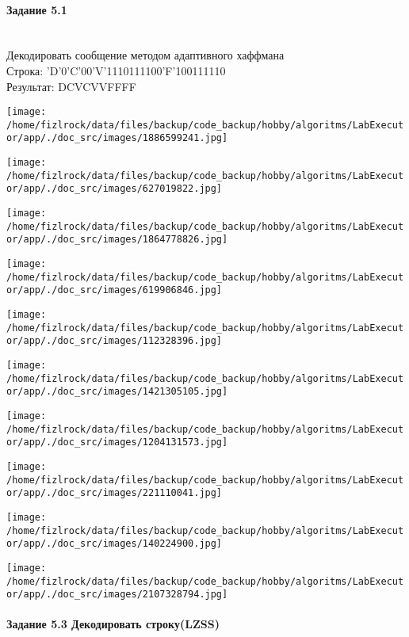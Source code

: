 \documentclass[a4paper, 12pt]{article}
\begin{document}
\paragraph{Задание 5.1}

\\ 

Декодировать сообщение методом адаптивного хаффмана \\
Строка: 
'D'0'C'00'V'1110111100'F'100111110\\
Результат: DCVCVVFFFF

\texttt{[image: /home/fizlrock/data/files/backup/code\_backup/hobby/algoritms/LabExecutor/app/./doc\_src/images/1886599241.jpg]}

\texttt{[image: /home/fizlrock/data/files/backup/code\_backup/hobby/algoritms/LabExecutor/app/./doc\_src/images/627019822.jpg]}

\texttt{[image: /home/fizlrock/data/files/backup/code\_backup/hobby/algoritms/LabExecutor/app/./doc\_src/images/1864778826.jpg]}

\texttt{[image: /home/fizlrock/data/files/backup/code\_backup/hobby/algoritms/LabExecutor/app/./doc\_src/images/619906846.jpg]}

\texttt{[image: /home/fizlrock/data/files/backup/code\_backup/hobby/algoritms/LabExecutor/app/./doc\_src/images/112328396.jpg]}

\texttt{[image: /home/fizlrock/data/files/backup/code\_backup/hobby/algoritms/LabExecutor/app/./doc\_src/images/1421305105.jpg]}

\texttt{[image: /home/fizlrock/data/files/backup/code\_backup/hobby/algoritms/LabExecutor/app/./doc\_src/images/1204131573.jpg]}

\texttt{[image: /home/fizlrock/data/files/backup/code\_backup/hobby/algoritms/LabExecutor/app/./doc\_src/images/221110041.jpg]}

\texttt{[image: /home/fizlrock/data/files/backup/code\_backup/hobby/algoritms/LabExecutor/app/./doc\_src/images/140224900.jpg]}

\texttt{[image: /home/fizlrock/data/files/backup/code\_backup/hobby/algoritms/LabExecutor/app/./doc\_src/images/2107328794.jpg]}
\pagebreak
\paragraph{Задание 5.3 Декодировать строку(LZSS)\\}
\end{document}
